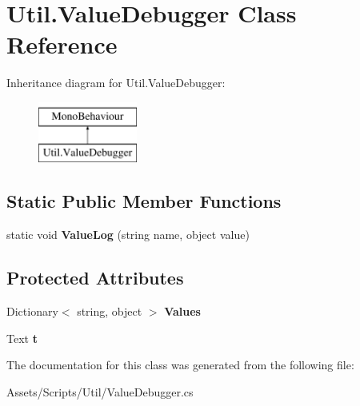 \hypertarget{class_util_1_1_value_debugger}{}\section{Util.\+Value\+Debugger Class Reference}
\label{class_util_1_1_value_debugger}
Inheritance diagram for Util.\+Value\+Debugger\+:\begin{figure}[H]
\begin{center}
\leavevmode
\includegraphics[height=2.000000cm]{class_util_1_1_value_debugger}
\end{center}
\end{figure}
\subsection*{Static Public Member Functions}
\begin{DoxyCompactItemize}
\item 
static void {\bfseries Value\+Log} (string name, object value)\hypertarget{class_util_1_1_value_debugger_a5716ccc5130a9034326be2ca7a86ca33}{}\label{class_util_1_1_value_debugger_a5716ccc5130a9034326be2ca7a86ca33}

\end{DoxyCompactItemize}
\subsection*{Protected Attributes}
\begin{DoxyCompactItemize}
\item 
Dictionary$<$ string, object $>$ {\bfseries Values}\hypertarget{class_util_1_1_value_debugger_a14e78acfd0a9df95ade816a1bdfb940c}{}\label{class_util_1_1_value_debugger_a14e78acfd0a9df95ade816a1bdfb940c}

\item 
Text {\bfseries t}\hypertarget{class_util_1_1_value_debugger_af93bcd716946c3554f4a524b87b63907}{}\label{class_util_1_1_value_debugger_af93bcd716946c3554f4a524b87b63907}

\end{DoxyCompactItemize}


The documentation for this class was generated from the following file\+:\begin{DoxyCompactItemize}
\item 
Assets/\+Scripts/\+Util/Value\+Debugger.\+cs\end{DoxyCompactItemize}
